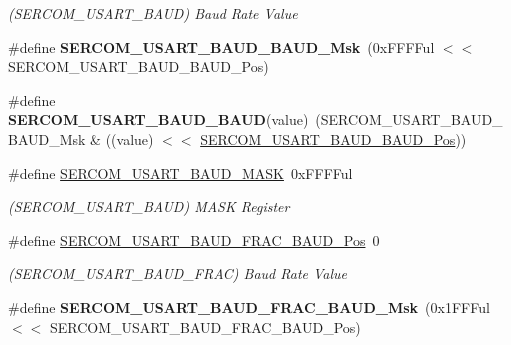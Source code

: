 \begin{DoxyCompactItemize}
\begin{DoxyCompactList}\small\item\em (S\+E\+R\+C\+O\+M\+\_\+\+U\+S\+A\+R\+T\+\_\+\+B\+A\+U\+D) Baud Rate Value \end{DoxyCompactList}\item 
\hypertarget{group___s_a_m_l21___s_e_r_c_o_m_ga4195a1b013045d8c0232bd2d13547ec2}{}\#define {\bfseries S\+E\+R\+C\+O\+M\+\_\+\+U\+S\+A\+R\+T\+\_\+\+B\+A\+U\+D\+\_\+\+B\+A\+U\+D\+\_\+\+Msk}~(0x\+F\+F\+F\+Ful $<$$<$ S\+E\+R\+C\+O\+M\+\_\+\+U\+S\+A\+R\+T\+\_\+\+B\+A\+U\+D\+\_\+\+B\+A\+U\+D\+\_\+\+Pos)\label{group___s_a_m_l21___s_e_r_c_o_m_ga4195a1b013045d8c0232bd2d13547ec2}

\item 
\hypertarget{group___s_a_m_l21___s_e_r_c_o_m_gaccca857da320aa1301ea06547a1e78c1}{}\#define {\bfseries S\+E\+R\+C\+O\+M\+\_\+\+U\+S\+A\+R\+T\+\_\+\+B\+A\+U\+D\+\_\+\+B\+A\+U\+D}(value)~(S\+E\+R\+C\+O\+M\+\_\+\+U\+S\+A\+R\+T\+\_\+\+B\+A\+U\+D\+\_\+\+B\+A\+U\+D\+\_\+\+Msk \& ((value) $<$$<$ \hyperlink{group___s_a_m_l21___s_e_r_c_o_m_ga1def645e5960fea081f9adc3c252e8e4}{S\+E\+R\+C\+O\+M\+\_\+\+U\+S\+A\+R\+T\+\_\+\+B\+A\+U\+D\+\_\+\+B\+A\+U\+D\+\_\+\+Pos}))\label{group___s_a_m_l21___s_e_r_c_o_m_gaccca857da320aa1301ea06547a1e78c1}

\item 
\hypertarget{group___s_a_m_l21___s_e_r_c_o_m_gaaf98a171c15e5319e28d8013efd2b9a4}{}\#define \hyperlink{group___s_a_m_l21___s_e_r_c_o_m_gaaf98a171c15e5319e28d8013efd2b9a4}{S\+E\+R\+C\+O\+M\+\_\+\+U\+S\+A\+R\+T\+\_\+\+B\+A\+U\+D\+\_\+\+M\+A\+S\+K}~0x\+F\+F\+F\+Ful\label{group___s_a_m_l21___s_e_r_c_o_m_gaaf98a171c15e5319e28d8013efd2b9a4}

\begin{DoxyCompactList}\small\item\em (S\+E\+R\+C\+O\+M\+\_\+\+U\+S\+A\+R\+T\+\_\+\+B\+A\+U\+D) M\+A\+S\+K Register \end{DoxyCompactList}\item 
\hypertarget{group___s_a_m_l21___s_e_r_c_o_m_ga2091fb88df34a0e20b88f6e63c31d953}{}\#define \hyperlink{group___s_a_m_l21___s_e_r_c_o_m_ga2091fb88df34a0e20b88f6e63c31d953}{S\+E\+R\+C\+O\+M\+\_\+\+U\+S\+A\+R\+T\+\_\+\+B\+A\+U\+D\+\_\+\+F\+R\+A\+C\+\_\+\+B\+A\+U\+D\+\_\+\+Pos}~0\label{group___s_a_m_l21___s_e_r_c_o_m_ga2091fb88df34a0e20b88f6e63c31d953}

\begin{DoxyCompactList}\small\item\em (S\+E\+R\+C\+O\+M\+\_\+\+U\+S\+A\+R\+T\+\_\+\+B\+A\+U\+D\+\_\+\+F\+R\+A\+C) Baud Rate Value \end{DoxyCompactList}\item 
\hypertarget{group___s_a_m_l21___s_e_r_c_o_m_gaa3b2102f618950fab2ac64583abb703b}{}\#define {\bfseries S\+E\+R\+C\+O\+M\+\_\+\+U\+S\+A\+R\+T\+\_\+\+B\+A\+U\+D\+\_\+\+F\+R\+A\+C\+\_\+\+B\+A\+U\+D\+\_\+\+Msk}~(0x1\+F\+F\+Ful $<$$<$ S\+E\+R\+C\+O\+M\+\_\+\+U\+S\+A\+R\+T\+\_\+\+B\+A\+U\+D\+\_\+\+F\+R\+A\+C\+\_\+\+B\+A\+U\+D\+\_\+\+Pos)\label{group___s_a_m_l21___s_e_r_c_o_m_gaa3b2102f618950fab2ac64583abb703b}


\end{DoxyCompactItemize}

